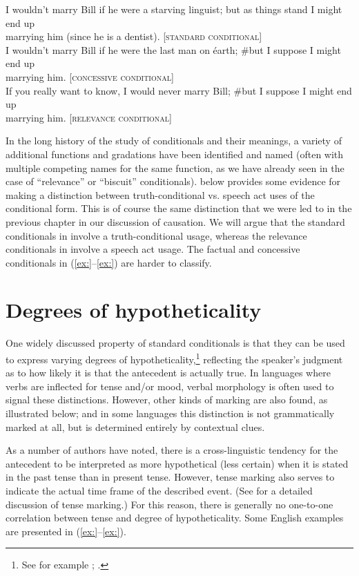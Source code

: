 \ea
\ea I wouldn’t marry Bill if he were a starving linguist; but as things stand I might end up\\
  marrying him (since he is a dentist).  [\textsc{standard} \textsc{conditional}]\\
\ex I wouldn’t marry Bill if he were the last man on éarth; \#but I suppose I might end up\\
  marrying him.  [\textsc{concessive conditional}]\\
\ex If you really want to know, I would never marry Bill; \#but I suppose I might end up\\
  marrying him.  [\textsc{relevance} \textsc{conditional}]
                       \z
\z


In the long history of the study of conditionals and their meanings, a variety of additional functions and gradations have been identified and named (often with multiple competing names for the same function, as we have already seen in the case of “relevance” or “biscuit” conditionals).  below provides some evidence for making a distinction between truth-conditional vs. speech act uses of the conditional form. This is of course the same distinction that we were led to in the previous chapter in our discussion of causation. We will argue that the standard conditionals in  involve a truth-conditional usage, whereas the relevance conditionals in  involve a speech act usage. The factual and concessive conditionals in (\ref{ex:}--\ref{ex:}) are harder to classify.


\section{Degrees of hypotheticality}\label{sec:19.3}

One widely discussed property of standard conditionals is that they can be used to express varying degrees of hypotheticality,\footnote{See for example \citet{Comrie1986}; \citet{ThompsonEtAl2007}.} reflecting the speaker’s judgment as to how likely it is that the antecedent is actually true. In languages where verbs are inflected for tense and/or mood, verbal morphology is often used to signal these distinctions. However, other kinds of marking are also found, as illustrated below; and in some languages this distinction is not grammatically marked at all, but is determined entirely by contextual clues.



As a number of authors have noted, there is a cross-linguistic tendency for the antecedent to be interpreted as more hypothetical (less certain) when it is stated in the past tense than in present tense. However, tense marking also serves to indicate the actual time frame of the described event. (See  for a detailed discussion of tense marking.) For this reason, there is generally no one-to-one correlation between tense and degree of hypotheticality. Some English examples are presented in (\ref{ex:}--\ref{ex:}).



